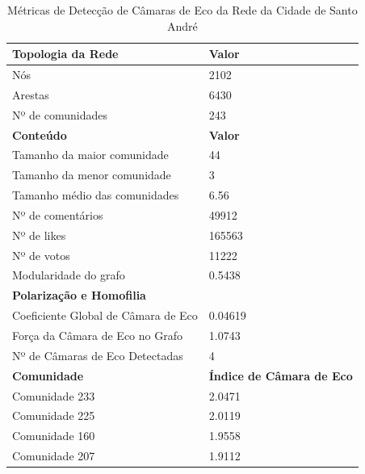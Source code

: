 \begin{table}[ht]
	\centering
	\caption{Métricas de Detecção de Câmaras de Eco da Rede da Cidade de Santo André}
	\label{tab:echo-chamber-metrics-santo-andre}
	\begin{tabular}{l|l}
		\toprule
		\textbf{Topologia da Rede}          & \textbf{Valor}                   \\
		\midrule
		Nós                                 & 2102                             \\
		Arestas                             & 6430                             \\
		Nº de comunidades                   & 243                              \\
		\toprule
		\textbf{Conteúdo}                   & \textbf{Valor}                   \\
		\midrule
		Tamanho da maior comunidade         & 44                               \\
		Tamanho da menor comunidade         & 3                                \\
		Tamanho médio das comunidades       & 6.56                             \\
		Nº de comentários                   & 49912                            \\
		Nº de likes                         & 165563                           \\
		Nº de votos                         & 11222                            \\
		Modularidade do grafo               & 0.5438                           \\
		\midrule
		\textbf{Polarização e Homofilia}    &                                  \\
		\midrule
		Coeficiente Global de Câmara de Eco & 0.04619                          \\
		Força da Câmara de Eco no Grafo     & 1.0743                           \\
		Nº de Câmaras de Eco Detectadas     & 4                                \\
		\midrule
		\textbf{Comunidade}                 & \textbf{Índice de Câmara de Eco} \\
		\midrule
		Comunidade 233                      & 2.0471                           \\
		Comunidade 225                      & 2.0119                           \\
		Comunidade 160                      & 1.9558                           \\
		Comunidade 207                      & 1.9112                           \\
		\bottomrule
	\end{tabular}
\end{table}

